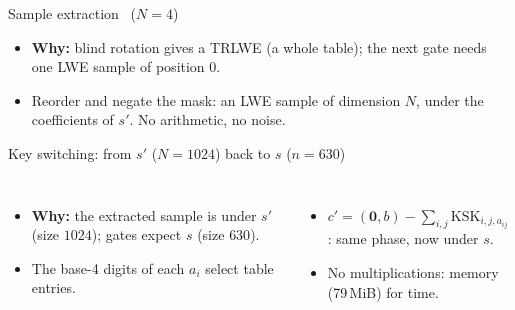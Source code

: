 \documentclass[aspectratio=169,11pt]{beamer}
\newcommand{\KSK}{\mathrm{KSK}}
\newcommand{\muted}[1]{{\color{cGray}#1}}
\begin{document}
\begin{frame}{Sample extraction \ \muted{\normalsize($N=4$)}}
\centering


\vspace{10pt}
\begin{itemize}
  \item \textbf{Why:} blind rotation gives a TRLWE (a whole table); the next
        gate needs \alert{one LWE} sample of position $0$.
  \item Reorder and negate the mask: an LWE sample of dimension $N$, under the
        coefficients of $s'$. \alert{No arithmetic, no noise.}
\end{itemize}
\end{frame}

\begin{frame}{Key switching: from $s'$ ($N=1024$) back to $s$ ($n=630$)}
\centering
\scalebox{0.95}{}

\vspace{8pt}
\begin{columns}[T,onlytextwidth]
\begin{itemize}
  \item \textbf{Why:} the extracted sample is under $s'$ (size $1024$); gates
        expect $s$ (size $630$).
  \item The base-4 digits of each $a_i$ select table entries.
\end{itemize}
\begin{itemize}
  \item $c'=(\mathbf0,b)-\sum_{i,j}\KSK_{i,j,a_{ij}}$: same phase, now under $s$.
  \item \alert{No multiplications}: memory (79\,MiB) for time.
\end{itemize}
\end{columns}
\end{frame}
\end{document}
